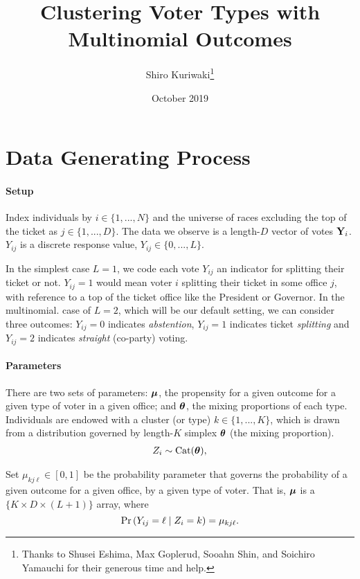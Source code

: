 \documentclass[11pt]{article}
\title{ \Large\textbf{Clustering Voter Types with Multinomial Outcomes}}
\author{\normalsize  Shiro Kuriwaki\thanks{Thanks to Shusei Eshima, Max Goplerud, Sooahn Shin, and Soichiro Yamauchi for their generous time and help.} }
\date{\normalsize October 2019}
\begin{document}
\maketitle

\onehalfspacing


\section{Data Generating Process}


\paragraph{Setup}

Index individuals by \(i \in \{1, ..., N\}\) and the universe of races
excluding the top of the ticket as \(j \in \{1, ..., D\}\). The data we
observe is a length-\(D\) vector of votes \(\mathbf{Y}_i\). \(Y_{ij}\) is a
discrete response value, \(Y_{ij} \in \{0, ..., L\}\). 

In the simplest case \(L = 1\), we code each vote \(Y_{ij}\) an indicator for splitting their ticket or not. \(Y_{ij} = 1\) would mean voter \(i\) splitting their ticket in some office \(j\), with reference to a top of the ticket office like the President or Governor. In the multinomial. case of \(L = 2\), which will be our default setting, we can consider three outcomes: \(Y_{ij} = 0\) indicates \emph{abstention}, \(Y_{ij} = 1\) indicates ticket \emph{splitting} and \(Y_{ij} = 2\) indicates \emph{straight} (co-party) voting.  


\paragraph{Parameters}


There are two sets of parameters: \(\bm{\mu}\), the propensity for a given outcome for a given type of voter in a given office; and \(\bm{\theta}\), the mixing proportions of each type.  Individuals are endowed with a cluster (or type) \(k \in \{1, ..., K\}\), which is drawn from a distribution governed by length-\(K\) simplex \(\bm{\theta}\) (the mixing proportion).
\begin{align*}
Z_i \sim  \text{Cat}(\bm{\theta}),
\end{align*}

Set \(\mu_{kj\ell} \in [0, 1]\) be the probability parameter that governs the probability of a given outcome for a given office, by a given type of voter. That is, \(\bm{\mu}\) is a \(\{K \times D \times (L + 1)\}\) array, where 
 \[\mathbb{\Pr}\left(Y_{ij} = \ell \mid Z_i = k\right) = \mu_{kj\ell}.\]
\end{document}
